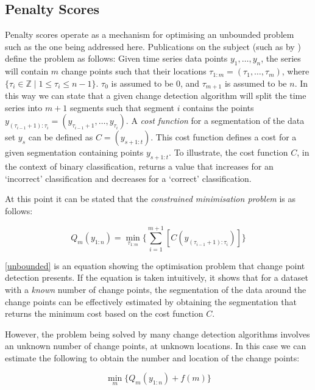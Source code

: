 \documentclass[../main.tex]{subfiles}
\begin{document}
\subsection{Penalty Scores}

Penalty scores operate as a mechanism for optimising an unbounded problem such as the one being addressed here. Publications on the subject (such as  by \citeauthor{Haynes2014} \cite{Haynes2014}) define the problem as follows: Given time series data points $y_1,\ldots,y_n$, the series will contain $m$ change points such that their locations $\tau_{1:m} = (\tau_1,\ldots,\tau_m)$, where $\{\tau_i \in \mathbb{Z} \mid 1 \leqslant \tau_i \leqslant n-1\}$. $\tau_0$ is assumed to be 0, and $\tau_{m+1}$ is assumed to be $n$. In this way we can state that a given change detection algorithm will split the time series into $m + 1$ segments such that segment $i$ contains the points $y_{(\tau_{i-1}+1):\tau_i} = (y_{\tau_{i-1} + 1},\dots,y_{\tau_i})$. A \emph{cost function} for a segmentation of the data set $y_s$ can be defined as $C = (y_{s+1:t})$. This cost function defines a cost for a given segmentation containing points $y_{s+1:t}$. To illustrate, the cost function $C$, in the context of binary classification, returns a value that increases for an `incorrect' classification and decreases for a `correct' classification.

At this point it can be stated that the \emph{constrained minimisation problem} is as follows:

\begin{equation}
\label{unbounded}
    Q_m(y_{1:n}) = \min_{\tau_{1:m}} \Bigg\{ \sum^{m+1}_{i=1}[C(y_{(\tau_{i - 1} + 1):\tau_i})] \Bigg\}
\end{equation}

\autoref{unbounded} is an equation showing the optimisation problem that change point detection presents. If the equation is taken intuitively, it shows that for a dataset with a \emph{known} number of change points, the segmentation of the data around the change points can be effectively estimated by obtaining the segmentation that returns the minimum cost based on the cost function $C$.

However, the problem being solved by many change detection algorithms involves an unknown number of change points, at unknown locations. In this case we can estimate the following to obtain the number and location of the change points:

\begin{equation}
\label{eqn:penalty}
    \min_{m} \big\{ Q_m(y_{1:n}) + f(m) \big\}
\end{equation}
\end{document}
